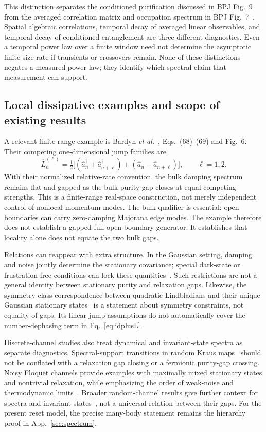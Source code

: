 \documentclass[aps,prb,onecolumn,nofootinbib,superscriptaddress,floatfix]{revtex4-2}
\begin{document}
This distinction separates the conditioned purification discussed
in BPJ Fig.~9 from the averaged correlation matrix and occupation
spectrum in BPJ Fig.~7~\cite{BPJ}. Spatial algebraic correlations,
temporal decay of averaged linear observables, and temporal decay
of conditioned entanglement are three different diagnostics.
Even a temporal power law over a finite window need not determine
the asymptotic finite-size rate if transients or crossovers remain.
None of these distinctions negates a measured power law; they
identify which spectral claim that measurement can support.

\subsection{Local dissipative examples and scope of existing results}
A relevant finite-range example is Bardyn \emph{et al.}~\cite{Bardyn},
Eqs.~(68)--(69) and Fig.~6. Their competing one-dimensional jump
families are
\begin{equation}
 \hat L_n^{(\ell)}=\tfrac12\bigl[
   (\hat a_n^\dagger+\hat a_{n+\ell}^\dagger)
   +(\hat a_n-\hat a_{n+\ell})\bigr],\qquad \ell=1,2.
 \label{eq:bardyn}
\end{equation}
With their normalized relative-rate convention, the bulk damping
spectrum remains flat and gapped as the bulk purity gap closes at
equal competing strengths. This is a finite-range real-space
construction, not merely independent control of nonlocal momentum
modes. The bulk qualifier is essential: open boundaries can carry
zero-damping Majorana edge modes. The example therefore does not
establish a gapped full open-boundary generator. It establishes
that locality alone does not equate the two bulk gaps.

Relations can reappear with extra structure. In the Gaussian
setting, damping and noise jointly determine the stationary
covariance; special dark-state or frustration-free conditions can
lock these quantities~\cite{Mittal}. Such restrictions are not a
general identity between stationary purity and relaxation gaps.
Likewise, the symmetry-class correspondence between quadratic
Lindbladians and their unique Gaussian stationary states~\cite{Mao}
is a statement about symmetry constraints, not equality of gaps.
Its linear-jump assumptions do not automatically cover the
number-dephasing term in Eq.~\eqref{eq:idplusL}.

Discrete-channel studies also treat dynamical and invariant-state
spectra as separate diagnostics. Spectral-support transitions in
random Kraus maps~\cite{Sa} should not be conflated with a relaxation
gap closing or a fermionic purity-gap crossing. Noisy Floquet
channels provide examples with maximally mixed stationary states
and nontrivial relaxation, while emphasizing the order of weak-noise
and thermodynamic limits~\cite{YS}. Broader random-channel results
give further context for spectra and invariant states~\cite{Kukulski},
not a universal relation between their gaps. For the present reset
model, the precise many-body statement remains the hierarchy proof
in App.~\ref{sec:spectrum}.
\end{document}
